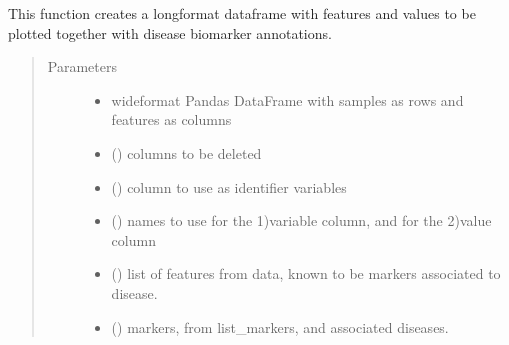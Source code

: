 \documentclass[letterpaper,10pt,english]{sphinxmanual}
\begin{document}
\begin{fulllineitems}
\label{\detokenize{_autosummary/analytics_core.analytics:analytics_core.analytics.analytics.get_ranking_with_markers}}
This function creates a long\sphinxhyphen{}format dataframe with features and values to be plotted together with disease biomarker annotations.
\begin{quote}\begin{description}
\item[{Parameters}] \leavevmode\begin{itemize}
\item {} 
 \textendash{} wide\sphinxhyphen{}format Pandas DataFrame with samples as rows and features as columns

\item {} 
 () \textendash{} columns to be deleted

\item {} 
 () \textendash{} column to use as identifier variables

\item {} 
 () \textendash{} names to use for the 1)variable column, and for the 2)value column

\item {} 
 () \textendash{} list of features from data, known to be markers associated to disease.

\item {} 
 () \textendash{} markers, from list\_markers, and associated diseases.


\end{itemize}
\end{description}
\end{quote}
\end{fulllineitems}
\end{document}
